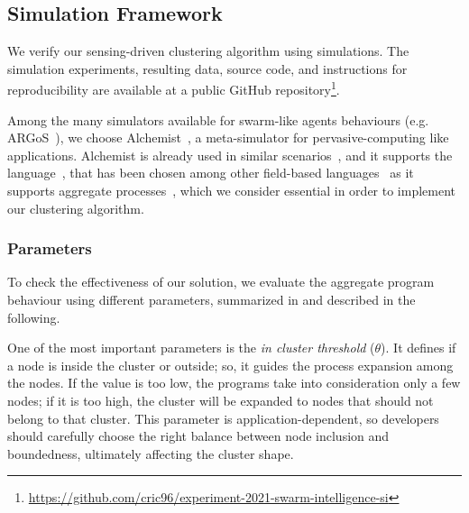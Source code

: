 \subsection{Simulation Framework}\label{s:eval:sim-framework}

We verify our sensing-driven clustering algorithm using simulations.
The simulation experiments, resulting data, source code, and instructions for reproducibility are available at a public GitHub repository\footnote{\url{https://github.com/cric96/experiment-2021-swarm-intelligence-si}}.

Among the many simulators available for swarm-like agents behaviours (e.g. ARGoS~\cite{Pinciroli:SI2012}),
 we choose Alchemist~\cite{DBLP:journals/jos/PianiniMV13}, a meta-simulator for pervasive-computing like applications.
%
Alchemist is already used in similar scenarios~\cite{DBLP:journals/eaai/CasadeiVAPD21}, and it supports the \scafi{} language~\cite{DBLP:conf/isola/CasadeiVAD20},
 that has been chosen among other field-based languages~\cite{DBLP:journals/jlap/ViroliBDACP19} as it supports aggregate processes~\cite{DBLP:conf/coordination/CasadeiVAPD19},
 which we consider essential in order to implement our clustering algorithm.


\subsubsection{Parameters}

To check the effectiveness of our solution, we evaluate the aggregate program behaviour
 using different parameters, summarized in  and described in the following.

One of the most important parameters is the \emph{in cluster threshold} ($\theta$).
 It defines if a node is inside the cluster or outside;
 so, it guides the  process expansion among the nodes.
 If the value is too low, the programs take into consideration only a few nodes;
 if it is too high, the cluster will be expanded to nodes that should not belong to that cluster.
 This parameter is application-dependent, so developers should carefully choose the right
 balance between node inclusion and boundedness, ultimately affecting the cluster shape.

